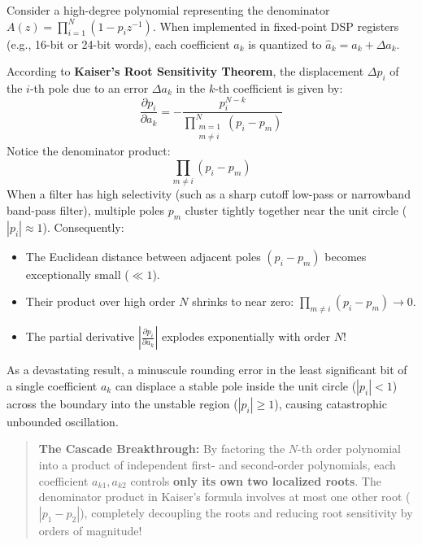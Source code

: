 \documentclass[11pt,a4paper]{article}
\begin{document}
Consider a high-degree polynomial representing the denominator $A(z) = \prod_{i=1}^N (1 - p_i z^{-1})$. When implemented in fixed-point DSP registers (e.g., 16-bit or 24-bit words), each coefficient $a_k$ is quantized to $\hat{a}_k = a_k + \Delta a_k$. 

According to \textbf{Kaiser's Root Sensitivity Theorem}, the displacement $\Delta p_i$ of the $i$-th pole due to an error $\Delta a_k$ in the $k$-th coefficient is given by:
\begin{equation}
\frac{\partial p_i}{\partial a_k} = -\frac{p_i^{N-k}}{\prod_{\substack{m=1 \\ m \ne i}}^{N} (p_i - p_m)}
\end{equation}
Notice the denominator product:
\begin{equation}
\prod_{m \ne i} (p_i - p_m)
\end{equation}
When a filter has high selectivity (such as a sharp cutoff low-pass or narrowband band-pass filter), multiple poles $p_m$ cluster tightly together near the unit circle ($|p_i| \approx 1$). Consequently:
\begin{itemize}
    \item The Euclidean distance between adjacent poles $(p_i - p_m)$ becomes exceptionally small ($\ll 1$).
    \item Their product over high order $N$ shrinks to near zero: $\prod_{m \ne i} (p_i - p_m) \to 0$.
    \item The partial derivative $\left| \frac{\partial p_i}{\partial a_k} \right|$ explodes exponentially with order $N$!
\end{itemize}
As a devastating result, a minuscule rounding error in the least significant bit of a single coefficient $a_k$ can displace a stable pole inside the unit circle ($|p_i| < 1$) across the boundary into the unstable region ($|p_i| \ge 1$), causing catastrophic unbounded oscillation.

\begin{quote}
\textbf{The Cascade Breakthrough:} By factoring the $N$-th order polynomial into a product of independent first- and second-order polynomials, each coefficient $a_{k1}, a_{k2}$ controls \textbf{only its own two localized roots}. The denominator product in Kaiser's formula involves at most one other root ($|p_1 - p_2|$), completely decoupling the roots and reducing root sensitivity by orders of magnitude!
\end{quote}
\end{document}
